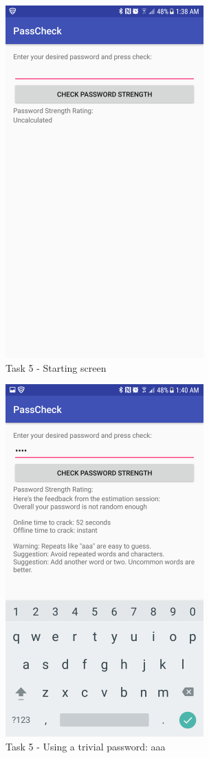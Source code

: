 \documentclass{article}
\begin{document}
	\begin{figure}[ht]
        \centerline{
            \includegraphics[width=3in]{img/t5s1.png}
        }
		\centering
		\caption{Task 5 - Starting screen}
	\end{figure}

	\begin{figure}[ht]
        \centerline{
            \includegraphics[width=3in]{img/t5s2.png}
        }
		\centering
		\caption{Task 5 - Using a trivial password: aaa}
	\end{figure}
\end{document}
